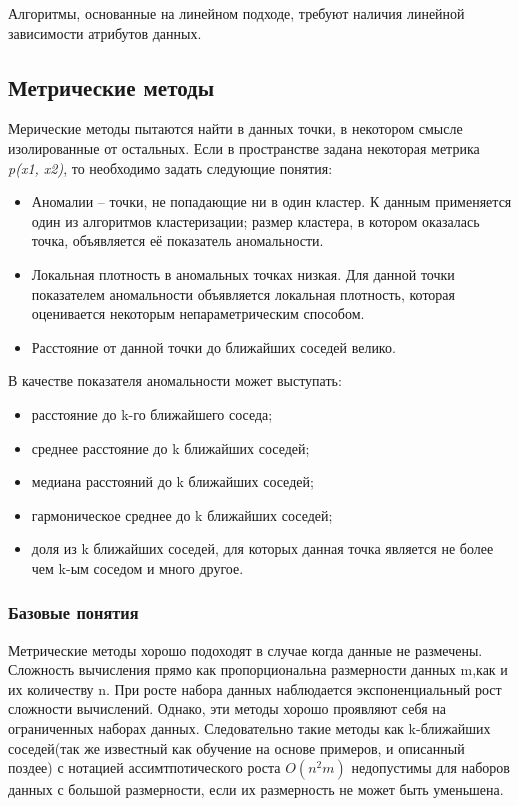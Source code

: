 Алгоритмы, основанные на линейном подходе, требуют  наличия линейной зависимости атрибутов данных. 
\subsection{Метрические методы}
Мерические методы пытаются найти в данных точки, в некотором смысле
изолированные от остальных\cite{Book01}. Если в пространстве задана некоторая метрика \textit{p(x1, x2)}, то необходимо задать следующие понятия:
\begin{itemize}
	\item  Аномалии – точки, не попадающие ни в один кластер. К данным применяется один из алгоритмов кластеризации; размер кластера, в котором оказалась точка, объявляется её показатель аномальности.
	\item Локальная плотность в аномальных точках низкая. Для данной точки показателем аномальности объявляется локальная плотность, которая оценивается некоторым непараметрическим способом.
	\item Расстояние от данной точки до ближайших соседей велико.
\end{itemize}
 В качестве показателя аномальности может выступать:
 \begin{itemize}
\item расстояние до k-го ближайшего соседа;
\item среднее расстояние до k ближайших соседей;
\item медиана расстояний до k ближайших соседей;
\item гармоническое среднее до k ближайших соседей;
\item доля из k ближайших соседей, для которых данная точка является не
более чем k-ым соседом и много другое.
\end{itemize}
\subsubsection{Базовые понятия}
Метрические методы хорошо подоходят в случае когда данные не размечены. Сложность вычисления прямо как пропорциональна размерности данных m,как и их количеству n. При росте набора данных наблюдается экспоненциальный рост сложности вычислений. Однако, эти методы хорошо проявляют себя на ограниченных наборах данных\cite{Book07}. Следовательно такие методы как k-ближайших соседей(так же известный как обучение на основе примеров, и описанный поздее) с нотацией ассимтпотического роста $O(n^2m)$ недопустимы для наборов данных с большой размерности, если их размерность не может быть уменьшена.

